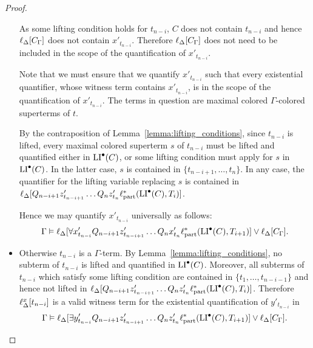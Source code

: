 \begin{proof}
\begin{itemize}
			As some lifting condition holds for $t_{n-i}$, $C$ does not contain $t_{n-i}$ and hence
			$\ell_{\Delta}[C_\Gamma]$ does not contain $x'_{t_{n-i}}$. Therefore $\ell_{\Delta}[C_\Gamma]$ does not need to be included in the scope of the quantification of $x'_{t_{n-i}}$.

			Note that we must ensure that we quantify $x'_{t_{n-i}}$ such that every existential quantifier, whose witness term contains $x'_{t_{n-i}}$, is in the scope of the quantification of $x'_{t_{n-i}}$. 
			The terms in question are maximal colored $\Gamma$-colored superterms of $t$.

			By the contraposition of Lemma~\ref{lemma:lifting_conditions}, since $t_{n-i}$ is lifted, every maximal colored superterm $s$ of $t_{n-i}$ must be lifted and quantified either in $\operatorname{LI}^\bullet(C)$, or some lifting condition must apply for $s$ in $\operatorname{LI}^\bullet(C)$.
			In the latter case, $s$ is contained in $\{t_{n-i+1},\dots, t_n\}$.
			In any case, the quantifier for the lifting variable replacing $s$ is contained in $\ell_{\Delta}[ Q_{n-i+1} z'_{t_{n-i+1}} \dots Q_n z'_{t_n} \ell_\mathrm{part}^* ( \operatorname{LI}^\bullet(C), T_i )]$.                                 


			Hence we may quantify $x'_{t_{n-i}}$ universally as follows:
			\[\Gamma \vDash \ell_{\Delta}[ \forall x'_{t_{n-i}} Q_{n-i+1} z'_{t_{n-i+1}} \dots Q_n x'_{t_{n}} \ell_\mathrm{part}^*( \operatorname{LI}^\bullet(C), T_{i+1} )] \lor \ell_{\Delta}[C_\Gamma].\]

		\item
			Otherwise $t_{n-i}$ is a $\Gamma$-term.
			By Lemma~\ref{lemma:lifting_conditions}, no subterm of $t_{n-i}$ is lifted and quantified in $\operatorname{LI}^\bullet(C)$.
			Moreover, all subterms of $t_{n-i}$ which satisfy some lifting condition are contained in $\{t_{1}, \dots, t_{n-i-1}\}$
			and hence not lifted in
			$\ell_{\Delta}[ Q_{n-i+1} z'_{t_{n-i+1}} \dots Q_n z'_{t_n} \ell_\mathrm{part}^*( \operatorname{LI}^\bullet(C), T_i )]$.
			Therefore $\ell_{\Delta}^{x}[t_{n-i}]$ is a valid witness term for the existential quantification of $y'_{t_{n-i}}$ in
			\[\Gamma \vDash \ell_{\Delta}[ \exists y'_{t_{n-i}} Q_{n-i+1} z'_{t_{n-i+1}} \dots Q_n z'_{t_n}  \ell_\mathrm{part}^*( \operatorname{LI}^\bullet(C), T_{i+1} )] \lor \ell_{\Delta}[C_\Gamma].\]



\end{itemize}
\end{proof}
